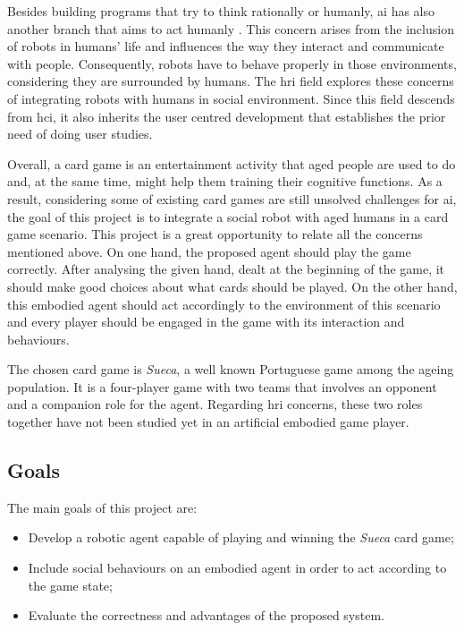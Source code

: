Besides building programs that try to think rationally or humanly, \gls{ai} has also another branch that aims to act humanly \cite{Russell2009}.
This concern arises from the inclusion of robots in humans' life and influences the way they interact and communicate with people.
Consequently, robots have to behave properly in those environments, considering they are surrounded by humans.
The \gls{hri} field explores these concerns of integrating robots with humans in social environment.
Since this field descends from \gls{hci}, it also inherits the user centred development that establishes the prior need of doing user studies.




Overall, a card game is an entertainment activity that aged people are used to do and, at the same time, might help them training their cognitive functions.
As a result, considering some of existing card games are still unsolved challenges for \gls{ai}, the goal of this project is to integrate a social robot with aged humans in a card game scenario.
This project is a great opportunity to relate all the concerns mentioned above.
On one hand, the proposed agent should play the game correctly.
After analysing the given hand, dealt at the beginning of the game, it should make good choices about what cards should be played.
On the other hand, this embodied agent should act accordingly to the environment of this scenario and every player should be engaged in the game with its interaction and behaviours.


The chosen card game is \emph{Sueca}, a well known Portuguese game among the ageing population.
It is a four-player game with two teams that involves an opponent and a companion role for the agent.
Regarding \gls{hri} concerns, these two roles together have not been studied yet in an artificial embodied game player.



\subsection{Goals}
\label{sec:goals}

The main goals of this project are:
\begin{itemize}
\item Develop a robotic agent capable of playing and winning the \emph{Sueca} card game;
\item Include social behaviours on an embodied agent in order to act according to the game state;
\item Evaluate the correctness and advantages of the proposed system.
\end{itemize}

